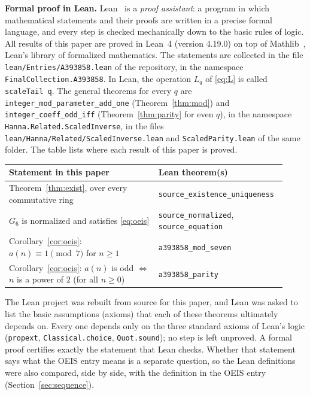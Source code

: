 \documentclass[11pt,a4paper]{article}
\theoremstyle{definition}
\theoremstyle{remark}
\newcommand{\para}[1]{\par\medskip\noindent\textbf{#1}\enspace}
\begin{document}
\para{Formal proof in Lean.}
Lean~\cite{lean} is a \emph{proof assistant}: a program in which mathematical statements and their proofs are written
in a precise formal language, and every step is checked mechanically down to the basic rules of logic. All results of
this paper are proved in Lean~4 (version 4.19.0) on top of Mathlib~\cite{mathlib}, Lean's library of formalized
mathematics. The statements are collected in the file \texttt{lean/Entries/A393858.lean} of the repository,
in the namespace \texttt{FinalCollection.A393858}. In Lean, the operation $L_q$ of \eqref{eq:L} is called \texttt{scaleTail q}. The general theorems for every $q$ are \texttt{integer\_mod\_parameter\_add\_one} (Theorem~\ref{thm:mod}) and \texttt{integer\_coeff\_odd\_iff} (Theorem~\ref{thm:parity} for even $q$), in the namespace \texttt{Hanna.\allowbreak Related.\allowbreak ScaledInverse}, in the files \texttt{lean/\allowbreak Hanna/\allowbreak Related/\allowbreak ScaledInverse.lean} and \texttt{ScaledParity.lean} of the same folder.
The table lists where each result of this paper is proved.
\begin{center}\small\renewcommand{\arraystretch}{1.25}
\begin{tabular}{>{\raggedright\arraybackslash}p{0.52\linewidth}>{\raggedright\arraybackslash}p{0.4\linewidth}}
\toprule
Statement in this paper & Lean theorem(s)\\
\midrule
Theorem~\ref{thm:exist}, over every commutative ring & \texttt{source\_\allowbreak{}existence\_\allowbreak{}uniqueness} \\
$G_{6}$ is normalized and satisfies \eqref{eq:oeis} & \texttt{source\_\allowbreak{}normalized}, \texttt{source\_\allowbreak{}equation} \\
Corollary~\ref{cor:oeis}: $a(n)\equiv1\pmod{7}$ for $n\ge1$ & \texttt{a393858\_\allowbreak{}mod\_\allowbreak{}seven} \\
Corollary~\ref{cor:oeis}: $a(n)$ is odd $\iff$ $n$ is a power of $2$ (for all $n\ge0$) & \texttt{a393858\_\allowbreak{}parity} \\
\bottomrule
\end{tabular}
\end{center}
The Lean project was rebuilt from source for this paper, and Lean was asked to list the basic assumptions (axioms)
that each of these theorems ultimately depends on. Every one depends only on the three standard axioms of Lean's logic
(\texttt{propext}, \texttt{Classical.choice}, \texttt{Quot.sound}); no step is left unproved. A formal proof certifies
exactly the statement that Lean checks. Whether that statement says what the OEIS entry means is a separate question,
so the Lean definitions were also compared, side by side, with the definition in the OEIS entry
(Section~\ref{sec:sequence}).
\end{document}
